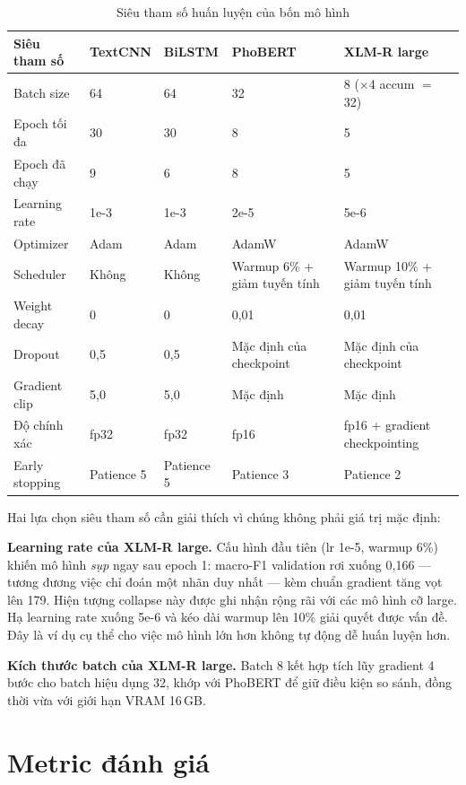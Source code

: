 \documentclass[12pt,a4paper,oneside]{report}
\begin{document}
\begin{table}[H]
\centering
\small
\caption{Siêu tham số huấn luyện của bốn mô hình}
\begin{tabularx}{\textwidth}{@{}L{2.9cm}YYYY@{}}
\toprule
\textbf{Siêu tham số} & \textbf{TextCNN} & \textbf{BiLSTM} & \textbf{PhoBERT} &
\textbf{XLM-R large} \\
\midrule
Batch size      & 64 & 64 & 32 & 8 ($\times$4 accum $=$ 32) \\
Epoch tối đa    & 30 & 30 & 8 & 5 \\
Epoch đã chạy   & 9 & 6 & 8 & 5 \\
Learning rate   & 1e-3 & 1e-3 & 2e-5 & 5e-6 \\
Optimizer       & Adam & Adam & AdamW & AdamW \\
Scheduler       & Không & Không & Warmup 6\% + giảm tuyến tính &
                  Warmup 10\% + giảm tuyến tính \\
Weight decay    & 0 & 0 & 0,01 & 0,01 \\
Dropout         & 0,5 & 0,5 & Mặc định của checkpoint & Mặc định của checkpoint \\
Gradient clip   & 5,0 & 5,0 & Mặc định & Mặc định \\
Độ chính xác    & fp32 & fp32 & fp16 & fp16 + gradient checkpointing \\
Early stopping  & Patience 5 & Patience 5 & Patience 3 & Patience 2 \\
\bottomrule
\end{tabularx}
\end{table}

Hai lựa chọn siêu tham số cần giải thích vì chúng không phải giá trị mặc định:

\textbf{Learning rate của XLM-R large.} Cấu hình đầu tiên (lr 1e-5, warmup 6\%) khiến mô
hình \textit{sụp} ngay sau epoch 1: macro-F1 validation rơi xuống 0,166 --- tương đương
việc chỉ đoán một nhãn duy nhất --- kèm chuẩn gradient tăng vọt lên 179. Hiện tượng
collapse này được ghi nhận rộng rãi với các mô hình cỡ large. Hạ learning rate xuống 5e-6
và kéo dài warmup lên 10\% giải quyết được vấn đề. Đây là ví dụ cụ thể cho việc mô hình
lớn hơn không tự động dễ huấn luyện hơn.

\textbf{Kích thước batch của XLM-R large.} Batch 8 kết hợp tích lũy gradient 4 bước cho
batch hiệu dụng 32, khớp với PhoBERT để giữ điều kiện so sánh, đồng thời vừa với giới hạn
VRAM 16\,GB.

\section{Metric đánh giá}
\end{document}

